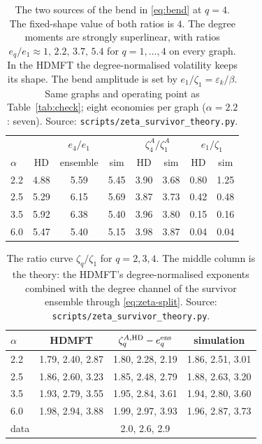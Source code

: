 \documentclass[11pt]{article}
\theoremstyle{remark}
\begin{document}
\begin{table}[h]
\centering
\small\setlength{\tabcolsep}{4pt}
\begin{tabular}{l|ccc|cc|cc}
\toprule
 & \multicolumn{3}{c|}{$e_4/e_1$} & \multicolumn{2}{c|}{$\zeta_4^A/\zeta_1^A$}
 & \multicolumn{2}{c}{$e_1/\zeta_1$}\\
$\alpha$ & HD & ensemble & sim & HD & sim & HD & sim\\
\midrule
2.2 & 4.88 & 5.59 & 5.45 & 3.90 & 3.68 & 0.80 & 1.25\\
2.5 & 5.29 & 6.15 & 5.69 & 3.87 & 3.73 & 0.42 & 0.48\\
3.5 & 5.92 & 6.38 & 5.40 & 3.96 & 3.80 & 0.15 & 0.16\\
6.0 & 5.47 & 5.40 & 5.15 & 3.98 & 3.87 & 0.04 & 0.04\\
\bottomrule
\end{tabular}
\caption{The two sources of the bend in \eqref{eq:bend} at $q=4$.  The fixed-shape value of both
ratios is $4$.  The degree moments are strongly superlinear, with ratios $e_q/e_1\approx
1,\,2.2,\,3.7,\,5.4$ for $q=1,\dots,4$ on every graph.  In the HDMFT the degree-normalised
volatility keeps its shape.  The bend amplitude is set by $e_1/\zeta_1=\varepsilon_k/\beta$.
Same graphs and operating point as Table~\ref{tab:check}; eight economies per graph ($\alpha=2.2$:
seven).  Source: \texttt{scripts/zeta\_survivor\_theory.py}.}
\label{tab:zeta-split}
\end{table}

\begin{table}[h]
\centering
\small\setlength{\tabcolsep}{4pt}
\begin{tabular}{l|c|c|c}
\toprule
$\alpha$ & HDMFT & $\zeta_q^{A,\rm HD}-e_q^{\rm ens}$ & simulation\\
\midrule
2.2 & 1.79, 2.40, 2.87 & 1.80, 2.28, 2.19 & 1.86, 2.51, 3.01\\
2.5 & 1.86, 2.60, 3.23 & 1.85, 2.48, 2.79 & 1.88, 2.63, 3.20\\
3.5 & 1.93, 2.79, 3.55 & 1.95, 2.84, 3.61 & 1.94, 2.80, 3.60\\
6.0 & 1.98, 2.94, 3.88 & 1.99, 2.97, 3.93 & 1.96, 2.87, 3.73\\
\midrule
data & \multicolumn{3}{c}{2.0, 2.6, 2.9}\\
\bottomrule
\end{tabular}
\caption{The ratio curve $\zeta_q/\zeta_1$ for $q=2,3,4$.  The middle column is the theory: the
HDMFT's degree-normalised exponents combined with the degree channel of the survivor ensemble
through \eqref{eq:zeta-split}.  Source: \texttt{scripts/zeta\_survivor\_theory.py}.}
\label{tab:zeta-ratio}
\end{table}
\end{document}
